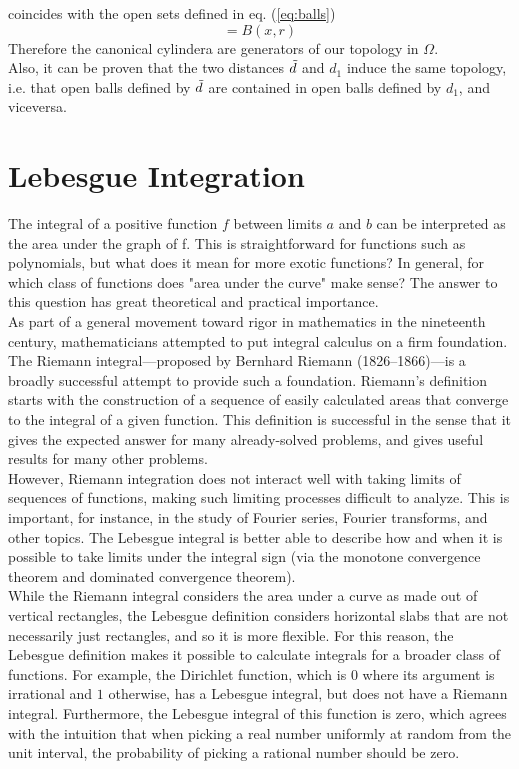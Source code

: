 coincides with the open sets defined in eq. (\ref{eq:balls}) 
\begin{equation}
    [x_1^{ \frac{\log(r)}{\log(\lambda)}}] = B(x,r) 
\end{equation}
Therefore the canonical cylindera are generators of our topology in $\Omega$. 
\\Also, it can be proven that the two distances $\Tilde{d}$ and $d_1$ induce the same topology, i.e. that open balls defined by $\Tilde{d}$ are contained in open balls defined by $d_1$, and viceversa.

\section{Lebesgue Integration}

\cite{Wikipedia} The integral of a positive function $f$ between limits $a$ and $b$ can be interpreted as the area under the graph of f. This is straightforward for functions such as polynomials, but what does it mean for more exotic functions? In general, for which class of functions does "area under the curve" make sense? The answer to this question has great theoretical and practical importance. \\
As part of a general movement toward rigor in mathematics in the nineteenth century, mathematicians attempted to put integral calculus on a firm foundation. The Riemann integral—proposed by Bernhard Riemann (1826–1866)—is a broadly successful attempt to provide such a foundation. Riemann's definition starts with the construction of a sequence of easily calculated areas that converge to the integral of a given function. This definition is successful in the sense that it gives the expected answer for many already-solved problems, and gives useful results for many other problems.\\
However, Riemann integration does not interact well with taking limits of sequences of functions, making such limiting processes difficult to analyze. This is important, for instance, in the study of Fourier series, Fourier transforms, and other topics. The Lebesgue integral is better able to describe how and when it is possible to take limits under the integral sign (via the monotone convergence theorem and dominated convergence theorem).\\
While the Riemann integral considers the area under a curve as made out of vertical rectangles, the Lebesgue definition considers horizontal slabs that are not necessarily just rectangles, and so it is more flexible. For this reason, the Lebesgue definition makes it possible to calculate integrals for a broader class of functions. For example, the Dirichlet function, which is $0$ where its argument is irrational and $1$ otherwise, has a Lebesgue integral, but does not have a Riemann integral. Furthermore, the Lebesgue integral of this function is zero, which agrees with the intuition that when picking a real number uniformly at random from the unit interval, the probability of picking a rational number should be zero.
